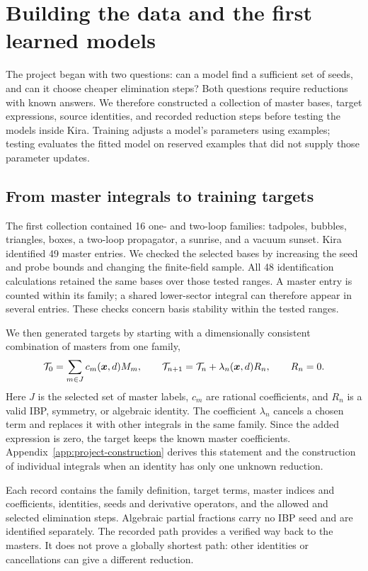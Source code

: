 \section{Building the data and the first learned models}
\label{sec:project-data}
The project began with two questions: can a model find a sufficient set of seeds, and can it choose cheaper elimination steps? Both questions require reductions with known answers. We therefore constructed a collection of master bases, target expressions, source identities, and recorded reduction steps before testing the models inside Kira. Training adjusts a model's parameters using examples; testing evaluates the fitted model on reserved examples that did not supply those parameter updates.

\subsection{From master integrals to training targets}
The first collection contained 16 one- and two-loop families: tadpoles, bubbles, triangles, boxes, a two-loop propagator, a sunrise, and a vacuum sunset. Kira identified 49 master entries. We checked the selected bases by increasing the seed and probe bounds and changing the finite-field sample. All 48 identification calculations retained the same bases over those tested ranges. A master entry is counted within its family; a shared lower-sector integral can therefore appear in several entries. These checks concern basis stability within the tested ranges.

We then generated targets by starting with a dimensionally consistent combination of masters from one family,
\begin{equation}
 {\cal T}_0=\sum_{m\in J}c_m(\boldsymbol x,d)M_m,
 \qquad
 {\cal T}_{n+1}={\cal T}_n+\lambda_n(\boldsymbol x,d)R_n,
 \qquad R_n=0.
 \label{eq:project-generation}
\end{equation}
Here $J$ is the selected set of master labels, $c_m$ are rational coefficients, and $R_n$ is a valid IBP, symmetry, or algebraic identity. The coefficient $\lambda_n$ cancels a chosen term and replaces it with other integrals in the same family. Since the added expression is zero, the target keeps the known master coefficients. Appendix~\ref{app:project-construction} derives this statement and the construction of individual integrals when an identity has only one unknown reduction.

Each record contains the family definition, target terms, master indices and coefficients, identities, seeds and derivative operators, and the allowed and selected elimination steps. Algebraic partial fractions carry no IBP seed and are identified separately. The recorded path provides a verified way back to the masters. It does not prove a globally shortest path: other identities or cancellations can give a different reduction.

